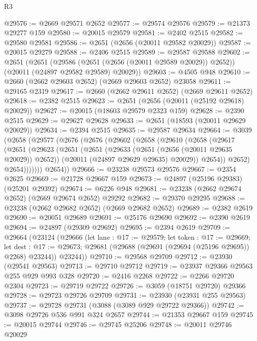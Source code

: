\begin{lexlean}{R3}
\begin{coremodule}
@29576 := @2669 @29571 @2652
@29577 := @29574 @29576
@29579 := @21373 @29277 @159
@29580 := @20015 @29579
@29581 := @2402 @2515
@29582 := @29580 @29581
@29586 := @2651 (@2656 (@20011 @29582 @20029))
@29587 := @20015 @29279
@29588 := @2406 @2515
@29589 := @29587 @29588
@29602 := @2651
    (@2651
      (@29586 (@2651 (@2656 (@20011 @29589 @20029)) @2652))
      (@20011 (@24897 @29582 @29589) @20029))
@29603 := @4505 @948
@29610 := @2660 (@2662 @29603 @2652) (@2669 @29603 @2652) @23058
@29611 := @29165 @2319
@29617 := @2660 (@2662 @29611 @2652) (@2669 @29611 @2652)
@29618 := @2382 @2515
@29623 := @2651 (@2656 (@20011 (@25192 @29618) @20029))
@29627 := @20015 (@18603 @29579 @2323 @159)
@29628 := @2390 @2515
@29629 := @29627 @29628
@29633 := @2651 (@18593 (@20011 @29629 @20029))
@29634 := @2394 @2515
@29635 := @29587 @29634
@29664 := @3039
    (@2658
      (@29577
        (@2676
          (@2676
            (@29602
              (@2658
                (@29610
                  (@2658
                    (@29617
                      (@2651
                        (@29623
                          (@2651
                            (@2651
                              (@29633 (@2651 (@2656 (@20011 @29635 @20029)) @2652))
                              (@20011 (@24897 @29629 @29635) @20029))
                            @2654))
                        @2652)
                      @2654)))))))
        @2654))
@29666 := @23238 @29573 @29576
@29667 := @2354 @2625
@29669 := @21728 @29667 @159
@29673 := @24897 (@25196 @29383) (@25201 @29392)
@29674 := @6226 @948
@29681 := @23238 (@2662 @29674 @2652) (@2669 @29674 @2652) @29292
@29682 := @29370 @29295
@29688 := @23238 (@2662 @29682 @2652) (@2669 @29682 @2652)
@29689 := @2382 @2619
@29690 := @20051 @29689
@29691 := @25176 @29690
@29692 := @2390 @2619
@29694 := @24897 (@29309 @29692)
@29695 := @2394 @2619
@29709 := @29664
    (@23124
      (@29666
        (let lane : @17 := @29579;
        let token : @17 := @29669;
        let dest : @17 := @29673; @29681 (@29688 (@29691 (@29694 (@25196 @29695)) @2268) @23244))
        @23244))
@29710 := @29568 @29709
@29712 := @23930 (@29541 @29563)
@29713 := @29710 @29712
@29719 := @23937 @29366 @29563 @255 @929 @993 @328
@29720 := @2416 @2268
@29722 := @2266 @29720 @2304
@29723 := @29719 @29722
@29726 := @3059 (@18751 @29720) @29366
@29728 := @29723 @29726 @29709
@29731 := @23930 (@23931 @255 @29563)
@29737 := @29728 @29731 (@3088 (@3089 @929 @29722 @29366))
@29742 := @3098 @29726 @536 @991 @324 @2657
@29744 := @21353 @29667 @159
@29745 := @20015 @29744
@29746 := @29745 @25206
@29748 := @20011 @29746 @20029

\end{coremodule}
\end{lexlean}
